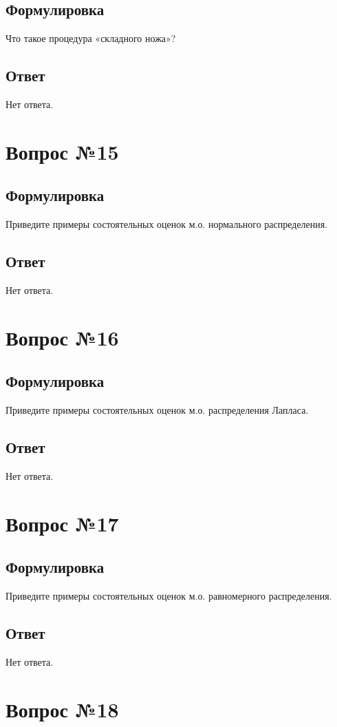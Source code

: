 \documentclass[a4]{article}
\begin{document}
	\subsection*{Формулировка}
	Что такое процедура «складного ножа»?
	\subsection*{Ответ}
	Нет ответа.
	
	\section{Вопрос №15}
	\subsection*{Формулировка}
	Приведите примеры состоятельных оценок м.о. нормального распределения.
	\subsection*{Ответ}
	Нет ответа.
	
	\section{Вопрос №16}
	\subsection*{Формулировка}
	Приведите примеры состоятельных оценок м.о. распределения Лапласа.
	\subsection*{Ответ}
	Нет ответа.
	
	\section{Вопрос №17}
	\subsection*{Формулировка}
	Приведите примеры состоятельных оценок м.о. равномерного распределения.
	\subsection*{Ответ}
	Нет ответа.
	
	\section{Вопрос №18}
\end{document}
